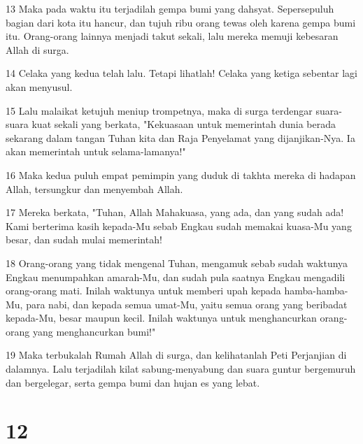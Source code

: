 \par 13 Maka pada waktu itu terjadilah gempa bumi yang dahsyat. Sepersepuluh bagian dari kota itu hancur, dan tujuh ribu orang tewas oleh karena gempa bumi itu. Orang-orang lainnya menjadi takut sekali, lalu mereka memuji kebesaran Allah di surga.
\par 14 Celaka yang kedua telah lalu. Tetapi lihatlah! Celaka yang ketiga sebentar lagi akan menyusul.
\par 15 Lalu malaikat ketujuh meniup trompetnya, maka di surga terdengar suara-suara kuat sekali yang berkata, "Kekuasaan untuk memerintah dunia berada sekarang dalam tangan Tuhan kita dan Raja Penyelamat yang dijanjikan-Nya. Ia akan memerintah untuk selama-lamanya!"
\par 16 Maka kedua puluh empat pemimpin yang duduk di takhta mereka di hadapan Allah, tersungkur dan menyembah Allah.
\par 17 Mereka berkata, "Tuhan, Allah Mahakuasa, yang ada, dan yang sudah ada! Kami berterima kasih kepada-Mu sebab Engkau sudah memakai kuasa-Mu yang besar, dan sudah mulai memerintah!
\par 18 Orang-orang yang tidak mengenal Tuhan, mengamuk sebab sudah waktunya Engkau menumpahkan amarah-Mu, dan sudah pula saatnya Engkau mengadili orang-orang mati. Inilah waktunya untuk memberi upah kepada hamba-hamba-Mu, para nabi, dan kepada semua umat-Mu, yaitu semua orang yang beribadat kepada-Mu, besar maupun kecil. Inilah waktunya untuk menghancurkan orang-orang yang menghancurkan bumi!"
\par 19 Maka terbukalah Rumah Allah di surga, dan kelihatanlah Peti Perjanjian di dalamnya. Lalu terjadilah kilat sabung-menyabung dan suara guntur bergemuruh dan bergelegar, serta gempa bumi dan hujan es yang lebat.

\chapter{12}

